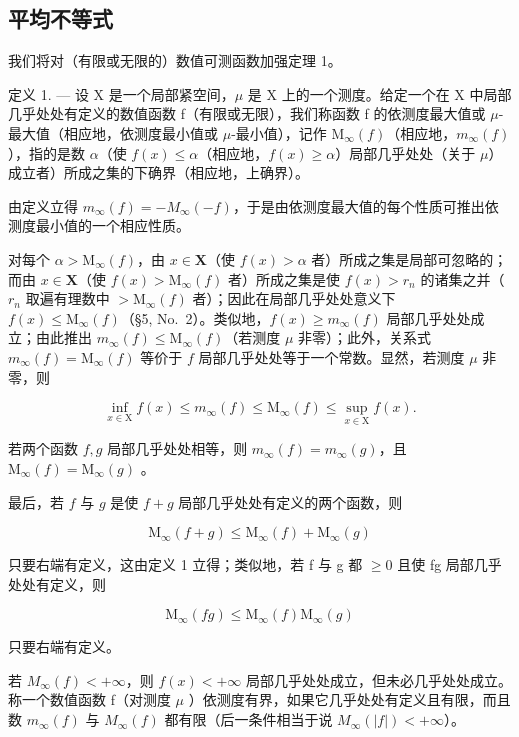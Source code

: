 \subsection{平均不等式}

我们将对（有限或无限的）数值可测函数加强定理 1。

定义 1. --- 设 X 是一个局部紧空间，\(\mu\) 是 X 上的一个测度。给定一个在 X 中局部几乎处处有定义的数值函数 f（有限或无限），我们称函数 f 的依测度最大值或 \(\mu\)-最大值（相应地，依测度最小值或 \(\mu\)-最小值），记作 \(\mathrm{M}_{\infty}(f)\)（相应地，\(m_{\infty}(f)\)），指的是数 \(\alpha\)（使 \(f(x) \leqslant \alpha\)（相应地，\(f(x) \geqslant \alpha\)）局部几乎处处（关于 \(\mu\)）成立者）所成之集的下确界（相应地，上确界）。

由定义立得 \(m_{\infty}(f) = -M_{\infty}(-f)\)，于是由依测度最大值的每个性质可推出依测度最小值的一个相应性质。

对每个 \(\alpha > \mathrm{M}_{\infty}(f)\)，由 \(x \in \mathbf{X}\)（使 \(f(x) > \alpha\) 者）所成之集是局部可忽略的；而由 \(x \in \mathbf{X}\)（使 \(f(x) > \mathrm{M}_{\infty}(f)\) 者）所成之集是使 \(f(x) > r_n\) 的诸集之并（\(r_n\) 取遍有理数中 \(> \mathrm{M}_{\infty}(f)\) 者）；因此在局部几乎处处意义下 \(f(x) \leqslant \mathrm{M}_{\infty}(f)\)（§5, No.~2）。类似地，\(f(x) \geqslant m_{\infty}(f)\) 局部几乎处处成立；由此推出 \(m_{\infty}(f) \leqslant \mathrm{M}_{\infty}(f)\)（若测度 \(\mu\) 非零）；此外，关系式 \(m_{\infty}(f) = \mathrm{M}_{\infty}(f)\) 等价于 \(f\) 局部几乎处处等于一个常数。显然，若测度 \(\mu\) 非零，则

\[
\inf _ {x \in \mathrm{X}} f (x) \leqslant m _ {\infty} (f) \leqslant \mathrm{M} _ {\infty} (f) \leqslant \sup _ {x \in \mathrm{X}} f (x).
\]

若两个函数 \(f, g\) 局部几乎处处相等，则 \(m_{\infty}(f) = m_{\infty}(g)\)，且 \(\mathrm{M}_{\infty}(f) = \mathrm{M}_{\infty}(g)\) 。

最后，若 \(f\) 与 \(g\) 是使 \(f + g\) 局部几乎处处有定义的两个函数，则

\[
\mathrm{M} _ {\infty} (f + g) \leqslant \mathrm{M} _ {\infty} (f) + \mathrm{M} _ {\infty} (g)\tag{1}
\]

只要右端有定义，这由定义 1 立得；类似地，若 f 与 g 都 \(\geqslant0\) 且使 fg 局部几乎处处有定义，则

\[
\mathrm{M} _ {\infty} (f g) \leqslant \mathrm{M} _ {\infty} (f) \mathrm{M} _ {\infty} (g)\tag{2}
\]

只要右端有定义。

若 \(M_{\infty}(f) < +\infty\)，则 \(f(x) < +\infty\) 局部几乎处处成立，但未必几乎处处成立。称一个数值函数 f（对测度 \(\mu\) ）依测度有界，如果它几乎处处有定义且有限，而且数 \(m_{\infty}(f)\) 与 \(M_{\infty}(f)\) 都有限（后一条件相当于说 \(M_{\infty}(|f|)<+\infty\)）。

